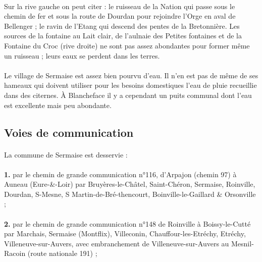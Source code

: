 \documentclass[../eBook.tex]{subfiles}
\begin{document}
    \paragraph{}Sur la rive gauche on peut citer : le ruisseau de la Nation qui passe sous le chemin de fer et sous la route de Dourdan pour rejoindre l'Orge en aval de Bellenger ; le ravin de l'Etang qui descend des pentes de la Bretonnière. Les sources de la fontaine au Lait clair, de l'aulnaie des Petites fontaines et de la Fontaine du Croc (rive droite) ne sont pas assez abondantes pour former même un ruisseau ; leurs eaux se perdent dans les terres.
    \paragraph{}Le village de Sermaise est assez bien pourvu d'eau. Il n'en est pas de même de ses hameaux qui doivent utiliser pour les besoins domestiques l'eau de pluie recueillie dans des citernes. À Blancheface il y a cependant un puits communal dont l'eau est excellente mais peu abondante.

  \newpage
  \subsection*{Voies de communication}
    \paragraph{}La commune de Sermaise est desservie :
    \paragraph{}\textbf{1.} par le chemin de grande communication n°116, d'Arpajon (chemin 97) à Auneau (Eure-\&{}-Loir) par Bruyères-le-Châtel, Saint-Chéron, Sermaise, Roinville, Dourdan, S-Mesne, S Martin-de-Bré-\linebreak{}thencourt, Boinville-le-Gaillard \& Orsonville ;
    \paragraph{}\textbf{2.} par le chemin de grande communication n°148 de Roinville à Boissy-le-Cutté par Marchais, Sermaise (Montflix), Villeconin, Chauffour-les-Etréchy, Etréchy, Villeneuve-sur-Auvers, avec embranchement de Villeneuve-sur-Auvers au Mesnil-Racoin (route nationale 191) ;
\end{document}
